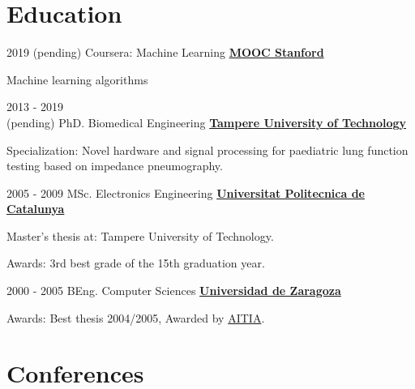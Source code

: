 \documentclass[letterpaper]{twentysecondcv} %
\begin{document}
\begin{RigthPage2}
\section{Education}


\begin{twenty} %
\twentyitemlist
    	{2019 (pending)}
        {Coursera: Machine Learning}
        {\href{https://www.coursera.org/learn/machine-learning}{\textbf{MOOC Stanford}}}
        {
        \item Machine learning algorithms 
        }	
\twentyitemlist
    	{2013 - 2019\\(pending)}
        {PhD. Biomedical Engineering}
        {\href{https://www.tut.fi/}{\textbf{Tampere University of Technology}}}
        {
        \item Specialization: Novel hardware and signal processing for paediatric lung function testing based on impedance pneumography.}
	\twentyitemlist
    	{2005 - 2009}
        {MSc. Electronics Engineering}
        {\href{https://www.upc.cat}{\textbf{Universitat Politecnica de Catalunya}}}
        {
        \item Master's thesis at: Tampere University of Technology.
        \item Awards: 3rd best grade of the 15th graduation year.
        }
     \twentyitemlist
    	{2000 - 2005}
        {BEng. Computer Sciences }
        {\href{http://www.unizar.es/}{\textbf{Universidad de Zaragoza } }}
        {
        \item Awards: Best thesis 2004/2005, Awarded by \href{http://www.aitia.org/}{AITIA}.}
\end{twenty}


\section{Conferences }

\begin{twenty} %


\end{twenty}
\end{RigthPage2}
\end{document}

